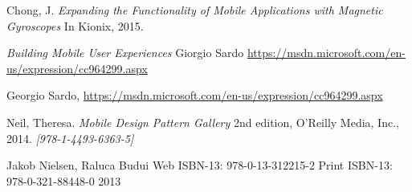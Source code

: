 \begin{thebibliography}{9}

  Chong, J. 
  \textit{Expanding the Functionality of Mobile Applications with Magnetic Gyroscopes} 
  In Kionix,
  2015.
  
	\textit{Building Mobile User Experiences}
	Giorgio Sardo
	\url{https://msdn.microsoft.com/en-us/expression/cc964299.aspx}
	
  Georgio Sardo,
  \url{https://msdn.microsoft.com/en-us/expression/cc964299.aspx}

	Neil, Theresa.
	\textit{Mobile Design Pattern Gallery}
	2nd edition,
	O'Reilly Media, Inc.,
	2014.
	\textit{[978-1-4493-6363-5]}
		
\end{thebibliography}
Jakob Nielsen, Raluca Budui
Web ISBN-13: 978-0-13-312215-2
Print ISBN-13: 978-0-321-88448-0
2013